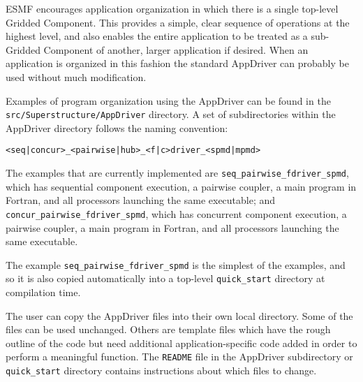 %


ESMF encourages application organization in which there is a single 
top-level Gridded Component.  This provides a simple, clear sequence
of operations at the highest level, and also enables the entire 
application to be treated as a sub-Gridded Component of another, larger 
application if desired.  When an application is organized in this fashion 
the standard AppDriver can probably be used without much modification.  

Examples of program organization using the AppDriver can be found in the 
{\tt src/Superstructure/AppDriver} directory.  A set of subdirectories 
within the AppDriver directory follows the naming convention:
\begin{verbatim}
<seq|concur>_<pairwise|hub>_<f|c>driver_<spmd|mpmd>
\end{verbatim}

The examples that are currently implemented are 
{\tt seq\_pairwise\_fdriver\_spmd}, which
has sequential component execution, a pairwise coupler, a main program
in Fortran, and all processors launching the same executable; and
{\tt concur\_pairwise\_fdriver\_spmd}, which 
has concurrent component execution, a pairwise coupler, a main program
in Fortran, and all processors launching the same executable.


The example {\tt seq\_pairwise\_fdriver\_spmd} is the simplest of the
examples, and so it is also copied automatically into a top-level 
{\tt quick\_start} directory at compilation time.  

The user can copy the AppDriver files into
their own local directory. Some of the files can be used unchanged.
Others are template files which have the rough outline of the code but
need additional application-specific code added in order to perform a
meaningful function.  The {\tt README} file in the AppDriver 
subdirectory or {\tt quick\_start} directory contains instructions about 
which files to change.

